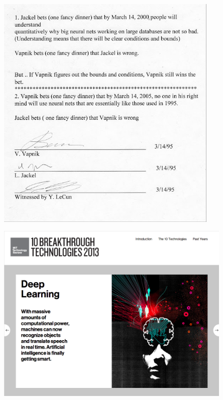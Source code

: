 \documentclass{beamer}
\begin{document}
\begin{frame}

\centering
\includegraphics[width=0.80\textwidth]{bet-by-2000.jpg}

\end{frame}

\begin{frame}

\centering
\includegraphics[width=0.85\textwidth]{mit_breakthrough_deepl.png}


\end{frame}
\end{document}
